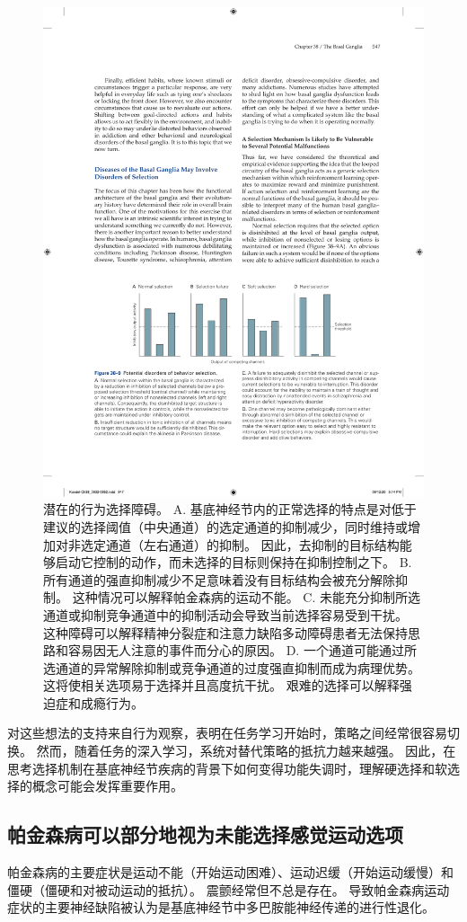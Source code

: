 \begin{figure}[htbp]
	\centering
	\includegraphics[width=0.75\linewidth]{chap38/fig_38_9}
	\caption{潜在的行为选择障碍。 A. 基底神经节内的正常选择的特点是对低于建议的选择阈值（中央通道）的选定通道的抑制减少，同时维持或增加对非选定通道（左右通道）的抑制。 因此，去抑制的目标结构能够启动它控制的动作，而未选择的目标则保持在抑制控制之下。 B. 所有通道的强直抑制减少不足意味着没有目标结构会被充分解除抑制。 这种情况可以解释帕金森病的运动不能。 C. 未能充分抑制所选通道或抑制竞争通道中的抑制活动会导致当前选择容易受到干扰。 这种障碍可以解释精神分裂症和注意力缺陷多动障碍患者无法保持思路和容易因无人注意的事件而分心的原因。 D. 一个通道可能通过所选通道的异常解除抑制或竞争通道的过度强直抑制而成为病理优势。 这将使相关选项易于选择并且高度抗干扰。 艰难的选择可以解释强迫症和成瘾行为。}
	\label{fig:38_9}
\end{figure}

对这些想法的支持来自行为观察，表明在任务学习开始时，策略之间经常很容易切换。 然而，随着任务的深入学习，系统对替代策略的抵抗力越来越强。 因此，在思考选择机制在基底神经节疾病的背景下如何变得功能失调时，理解硬选择和软选择的概念可能会发挥重要作用。

\subsection{帕金森病可以部分地视为未能选择感觉运动选项}
帕金森病的主要症状是运动不能（开始运动困难）、运动迟缓（开始运动缓慢）和僵硬（僵硬和对被动运动的抵抗）。 震颤经常但不总是存在。 导致帕金森病运动症状的主要神经缺陷被认为是基底神经节中多巴胺能神经传递的进行性退化。

